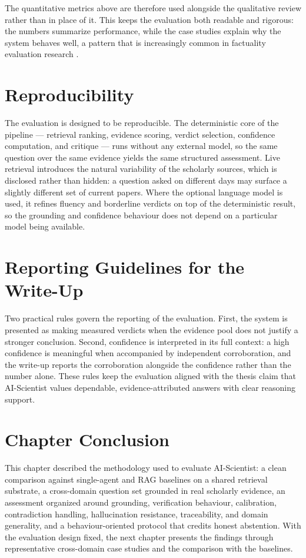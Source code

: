 The quantitative metrics above are therefore used alongside the qualitative review rather than in place of it. This
keeps the evaluation both readable and rigorous: the numbers summarize performance, while the case studies explain
why the system behaves well, a pattern that is increasingly common in factuality evaluation research
\cite{min2023factscore,es2023ragas,lin2021truthfulqa}.

\section{Reproducibility }

The evaluation is designed to be reproducible. The deterministic core of the pipeline --- retrieval ranking,
evidence scoring, verdict selection, confidence computation, and critique --- runs without any external model, so
the same question over the same evidence yields the same structured assessment. Live retrieval introduces the
natural variability of the scholarly sources, which is disclosed rather than hidden: a question asked on different
days may surface a slightly different set of current papers. Where the optional language model is used, it refines
fluency and borderline verdicts on top of the deterministic result, so the grounding and confidence behaviour does
not depend on a particular model being available.

\section{Reporting Guidelines for the Write-Up }

Two practical rules govern the reporting of the evaluation. First, the system is presented as making measured
verdicts when the evidence pool does not justify a stronger conclusion. Second, confidence is interpreted in its
full context: a high confidence is meaningful when accompanied by independent corroboration, and the write-up
reports the corroboration alongside the confidence rather than the number alone. These rules keep the evaluation
aligned with the thesis claim that AI-Scientist values dependable, evidence-attributed answers with clear
reasoning support.

\section{Chapter Conclusion }

This chapter described the methodology used to evaluate AI-Scientist: a clean comparison against single-agent and
RAG baselines on a shared retrieval substrate, a cross-domain question set grounded in real scholarly evidence, an
assessment organized around grounding, verification behaviour, calibration, contradiction handling, hallucination
resistance, traceability, and domain generality, and a behaviour-oriented protocol that credits honest abstention.
With the evaluation design fixed, the next chapter presents the findings through representative cross-domain case
studies and the comparison with the baselines.

